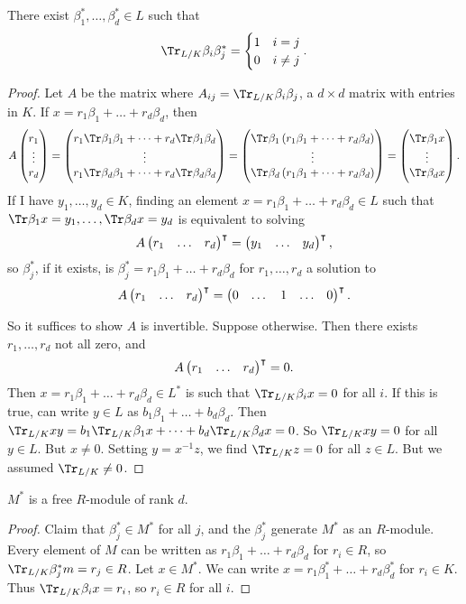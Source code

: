 \begin{proposition}
There exist $ \beta_1^*, \dots, \beta_d^* \in L $ such that
$$ \Tr_{L / K} \beta_i\beta_j^* =
\begin{cases}
1 & i = j \\
0 & i \ne j
\end{cases}.
$$
\end{proposition}

\begin{proof}
Let $ A $ be the matrix where $ A_{ij} = \Tr_{L / K} \beta_i\beta_j $, a $ d \times d $ matrix with entries in $ K $. If $ x = r_1\beta_1 + \dots + r_d\beta_d $, then
$$ A\threebyone{r_1}{\vdots}{r_d} = \threebyone{r_1\Tr \beta_1\beta_1 + \dots + r_d\Tr \beta_1\beta_d}{\vdots}{r_1\Tr \beta_d\beta_1 + \dots + r_d\Tr \beta_d\beta_d} = \threebyone{\Tr \beta_1\br{r_1\beta_1 + \dots + r_d\beta_d}}{\vdots}{\Tr \beta_d\br{r_1\beta_1 + \dots + r_d\beta_d}} = \threebyone{\Tr \beta_1x}{\vdots}{\Tr \beta_dx}. $$
If I have $ y_1, \dots, y_d \in K $, finding an element $ x = r_1\beta_1 + \dots + r_d\beta_d \in L $ such that $ \Tr \beta_1x = y_1, \dots, \Tr \beta_dx = y_d $ is equivalent to solving
$$ A\onebythree{r_1}{\dots}{r_d}^\intercal = \onebythree{y_1}{\dots}{y_d}^\intercal, $$
so $ \beta_j^* $, if it exists, is $ \beta_j^* = r_1\beta_1 + \dots + r_d\beta_d $ for $ r_1, \dots, r_d $ a solution to
$$ A\onebythree{r_1}{\dots}{r_d}^\intercal = \onebythree{0}{\dots & 1 & \dots}{0}^\intercal. $$

\pagebreak

So it suffices to show $ A $ is invertible. Suppose otherwise. Then there exists $ r_1, \dots, r_d $ not all zero, and
$$ A\onebythree{r_1}{\dots}{r_d}^\intercal = 0. $$
Then $ x = r_1\beta_1 + \dots + r_d\beta_d \in L^* $ is such that $ \Tr_{L / K} \beta_ix = 0 $ for all $ i $. If this is true, can write $ y \in L $ as $ b_1\beta_1 + \dots + b_d\beta_d $. Then $ \Tr_{L / K} xy = b_1\Tr_{L / K} \beta_1x + \dots + b_d\Tr_{L / K} \beta_dx = 0 $. So $ \Tr_{L / K} xy = 0 $ for all $ y \in L $. But $ x \ne 0 $. Setting $ y = x^{-1}z $, we find $ \Tr_{L / K} z = 0 $ for all $ z \in L $. But we assumed $ \Tr_{L / K} \ne 0 $.
\end{proof}

\begin{corollary}
$ M^* $ is a free $ R $-module of rank $ d $.
\end{corollary}

\begin{proof}
Claim that $ \beta_j^* \in M^* $ for all $ j $, and the $ \beta_j^* $ generate $ M^* $ as an $ R $-module. Every element of $ M $ can be written as $ r_1\beta_1 + \dots + r_d\beta_d $ for $ r_i \in R $, so $ \Tr_{L / K} \beta_j^*m = r_j \in R $. Let $ x \in M^* $. We can write $ x = r_1\beta_1^* + \dots + r_d\beta_d^* $ for $ r_i \in K $. Thus $ \Tr_{L / K} \beta_ix = r_i $, so $ r_i \in R $ for all $ i $.
\end{proof}

